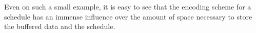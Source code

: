Even on such a small example, it is easy to see that the encoding
scheme for a schedule has an immense influence over the amount of
space necessary to store the buffered data and the schedule.

\begin{comment}
We can compare the storage efficiency of these two schedules by
assuming that one data item in a buffer requires $x$ amount of
memory and each entry in a schedule requires $y$ amount of memory.
Thus the two schedules will require the same amount of storage to
store themselves and execute if $11 x + 18 y = 39 x + 4 y$.

\begin{displaymath}
\begin{array}{rcl}
11 x + 18 y & = & 39 x + 4 y \\
14 y & = & 28 x \\
y & = & 2x
\end{array}
\end{displaymath}

Thus the smaller schedule is more efficient if every data item
requires less than twice the amount of storage than every entry in
the schedule.

One of the difficulties in scheduling {\StreamIt} programs lies in
finding a good set of trade-offs between schedule size and
buffering requirements.
\end{comment}

\begin{comment}

\subsection{Minimum Buffer Size between {\filters}}

As illustrated above, the amount of buffering in a {\pipeline} can
be affected greatly by the order of executions of {\filters} in the
{\pipeline}.  The following equation calculates the minimal buffer
size required in order for two {\filters} to be able to push data
between each other indefinitely in the most buffer-efficient way.
Buffers this size cannot always be achieved, because some
components require that data be buffered up for execution (ex.
{\feedbackloops} require data to exist internally in order to
execution to advance) or because extra latency constrains require
additional buffering.

\begin{equation}
buffer_{A \to B} = \left\lceil {{peek_B} \over {\gcd(push_A,
pop_B)}} - 1 \right\rceil \gcd (push_A, pop_B) + push_A
\end{equation}

\emph{I can explain this equation, but I cannot prove it.  what
should I do with this?  it's not necessary for the thesis, but it
is a neat result we never published (PLDI submission), nor have I
seen it in any other papers (nobody does peeking, so it can't be
anywhere else)}

\end{comment}
